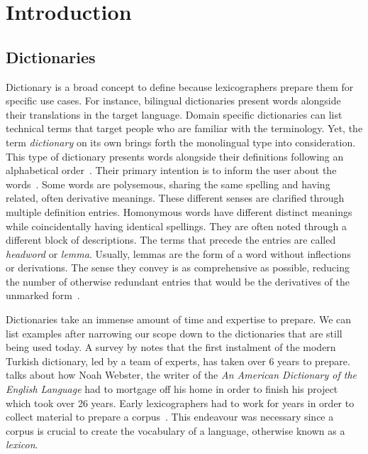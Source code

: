\chapter{Introduction}\label{chap:introduction}%
\section{Dictionaries}%
\label{sec:dictionaries}
Dictionary is a broad concept to define because lexicographers prepare them for specific use cases.
For instance, bilingual dictionaries present words alongside their translations in the target language.
Domain specific dictionaries can list technical terms that target people who are familiar with the terminology.
Yet, the term \emph{dictionary} on its own brings forth the monolingual type into consideration.
This type of dictionary presents words alongside their definitions following an alphabetical order~\cite{sterkenburg_practical_2003}.
Their primary intention is to inform the user about the words~\cite{uzun_modern_2005}.
Some words are polysemous, sharing the same spelling and having related, often derivative meanings.
These different senses are clarified through multiple definition entries.
Homonymous words have different distinct meanings while coincidentally having identical spellings.
They are often noted through a different block of descriptions.
The terms that precede the entries are called \emph{headword} or \emph{lemma}.
Usually, lemmas are the form of a word without inflections or derivations.
The sense they convey is as comprehensive as possible, reducing the number of otherwise redundant entries that would be the derivatives of the unmarked form~\cite{ibrahim_usta_turkce_2006}.

Dictionaries take an immense amount of time and expertise to prepare.
We can list examples after narrowing our scope down to the dictionaries that are still being used today.
A survey by \textcite{uzun_1945ten_1999} notes that the first instalment of the modern Turkish dictionary, led by a team of experts, has taken over 6 years to prepare.
\textcite{kendall_forgotten_2011} talks about how Noah Webster, the writer of the \emph{An American Dictionary of the English Language} had to mortgage off his home in order to finish his project which took over 26 years.
Early lexicographers had to work for years in order to collect material to prepare a corpus~\cite{uzun_1945ten_1999}.
This endeavour was necessary since a corpus is crucial to create the vocabulary of a language, otherwise known as a \emph{lexicon}.

